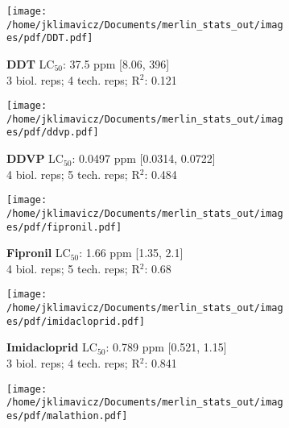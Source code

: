 \documentclass{article}
\begin{document}
\begin{figure}[thp!]
   \begin{subfigure}{0.500\textwidth}
      \centering
      \texttt{[image: /home/jklimavicz/Documents/merlin\_stats\_out/images/pdf/DDT.pdf]}
      \vspace{-0.05cm}
      \caption*{\textbf{DDT} LC$_{50}$: 37.5 ppm [8.06, 396] \\ 
3 biol. reps; 4 tech. reps; R$^2$: 0.121}
      \vspace{0.1cm}
   \end{subfigure}%
   \begin{subfigure}{0.500\textwidth}
      \centering
      \texttt{[image: /home/jklimavicz/Documents/merlin\_stats\_out/images/pdf/ddvp.pdf]}
      \vspace{-0.05cm}
      \caption*{\textbf{DDVP} LC$_{50}$: 0.0497 ppm [0.0314, 0.0722] \\ 
4 biol. reps; 5 tech. reps; R$^2$: 0.484}
      \vspace{0.1cm}
   \end{subfigure}%
\vspace{-0.1cm}
   \begin{subfigure}{0.500\textwidth}
      \centering
      \texttt{[image: /home/jklimavicz/Documents/merlin\_stats\_out/images/pdf/fipronil.pdf]}
      \vspace{-0.05cm}
      \caption*{\textbf{Fipronil} LC$_{50}$: 1.66 ppm [1.35, 2.1] \\ 
4 biol. reps; 5 tech. reps; R$^2$: 0.68}
      \vspace{0.1cm}
   \end{subfigure}%
   \begin{subfigure}{0.500\textwidth}
      \centering
      \texttt{[image: /home/jklimavicz/Documents/merlin\_stats\_out/images/pdf/imidacloprid.pdf]}
      \vspace{-0.05cm}
      \caption*{\textbf{Imidacloprid} LC$_{50}$: 0.789 ppm [0.521, 1.15] \\ 
3 biol. reps; 4 tech. reps; R$^2$: 0.841}
      \vspace{0.1cm}
   \end{subfigure}%
\vspace{-0.1cm}
   \begin{subfigure}{0.500\textwidth}
      \centering
      \texttt{[image: /home/jklimavicz/Documents/merlin\_stats\_out/images/pdf/malathion.pdf]}
      \vspace{-0.05cm}

\end{subfigure}
\end{figure}
\end{document}
